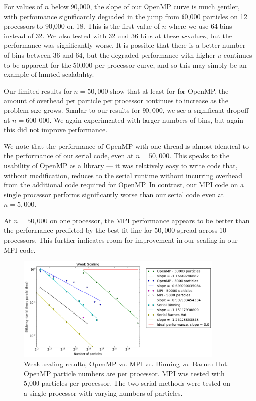 \documentclass{article}
\begin{document}
For values of $n$ below 90,000, the slope of our OpenMP curve is much gentler,
with performance significantly degraded in the jump from 60,000 particles on
12 processors to 90,000 on 18. This is the first value of $n$ where we use 64
bins instead of 32. We also tested with 32 and 36 bins at these $n$-values, but
the performance was significantly worse. It is possible that there is a better
number of bins between 36 and 64, but the degraded performance with higher $n$
continues to be apparent for the 50,000 per processor curve, and so this may
simply be an example of limited scalability.

Our limited results for $n=50,000$ show that at least for for OpenMP, the amount
of overhead per particle per processor continues to increase as the problem size
grows. Similar to our results for $90,000$, we see a significant dropoff at $n =
600,000$. We again experimented with larger numbers of bins, but again this did
not improve performance.

We note that the performance of OpenMP with one thread is almost identical to
the performance of our serial code, even at $n = 50,000$. This speaks to the
usability of OpenMP as a library --- it was relatively easy to write code that,
without modification, reduces to the serial runtime without incurring overhead
from the additional code required for OpenMP. In contrast, our MPI code on a
single processor performs significantly worse than our serial code even at $n =
5,000$.

At $n = 50,000$ on one processor, the MPI performance appears to be
better than the performance predicted by the best fit line for $50,000$ spread
across 10 processors. This further indicates room for improvement in our scaling
in our MPI code.
\begin{figure}[ht!]
\centering
\includegraphics[width=0.9\textwidth]{weak.png}
\caption{Weak scaling results, OpenMP vs. MPI vs. Binning vs.
Barnes-Hut. OpenMP particle numbers are per processor. MPI was tested
with 5,000 particles per processor. The two serial methods were tested
on a single processor with varying numbers of particles.}\label{fig:weak}
\end{figure}
\end{document}
